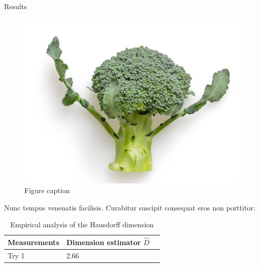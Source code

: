 \documentclass[]{beamer}
\begin{document}
\begin{frame}[t]
\begin{columns}[t]
\begin{column}{\twocolwid}
\begin{columns}[t,totalwidth=\twocolwid]
\begin{column}{\onecolwid}
    
    \begin{block}{Results}
    
    \begin{figure}
    \includegraphics[width=0.8\linewidth]{figures/placeholder.jpg}
    \caption{Figure caption}
    \end{figure}
    
    Nunc tempus venenatis facilisis. Curabitur suscipit consequat eros non porttitor:
    
    \begin{table}
    \vspace{2ex}
    \begin{tabular}{l l l}
    \hline
    \textbf{Measurements} & \textbf{Dimension estimator $\hat D$} \\
    \hline
    Try 1 & 2.66 \\
    \hline
    \end{tabular}
    \caption{Empirical analysis of the Hausdorff dimension}
    \end{table}
    
    \end{block}
    
    
    \end{column} %
    
    \end{columns} %
    

\end{column}
\end{columns}
\end{frame}
\end{document}
